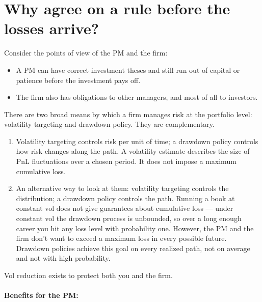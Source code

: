 \documentclass[11pt]{gappyarticle}
\begin{document}
\section{Why agree on a rule before the losses arrive?}
Consider the points of view of the PM and the firm:
\begin{itemize}
	\item 
A PM can have correct investment theses and still run out of capital or patience
before the investment pays off. 
\item The firm also has obligations to other managers, and most of all to investors.
\end{itemize}
There are two broad means by which a firm manages risk at the portfolio level: volatility targeting and drawdown policy. They are complementary. 


\begin{enumerate}
	\item
	{Volatility targeting controls risk per unit of time; a drawdown policy
controls how risk changes along the path.} A volatility estimate describes
the size of PnL fluctuations over a chosen period. It does not impose a
maximum cumulative loss. 
\item
	An alternative way to look at them: volatility targeting controls the distribution; a drawdown policy controls the path. Running a book at constant vol does not give guarantees about cumulative loss — under constant vol the drawdown process is unbounded, so over a long enough career you hit any loss level with probability one. However, the PM and the firm don't want to exceed a maximum loss in every possible future. Drawdown policies achieve this goal on every realized path, not on average and not with high probability.
\end{enumerate}
Vol reduction exists to protect both you and the firm. \\ \\
	\textbf{Benefits for the PM:}
\end{document}
